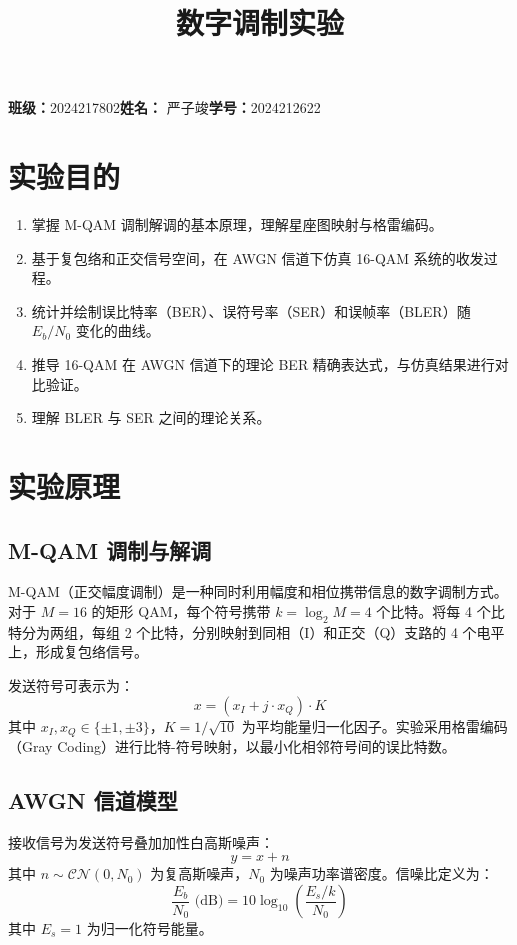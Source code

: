 \documentclass[UTF8]{ctexart}
\title{\textbf{数字调制实验}}
\author{}
\begin{document}
\maketitle

\begin{center}
    \textbf{班级：}2024217802\quad \textbf{姓名：} 严子竣\quad \textbf{学号：}2024212622
\end{center}

\section{实验目的}
\begin{enumerate}
    \item 掌握 M-QAM 调制解调的基本原理，理解星座图映射与格雷编码。
    \item 基于复包络和正交信号空间，在 AWGN 信道下仿真 16-QAM 系统的收发过程。
    \item 统计并绘制误比特率（BER）、误符号率（SER）和误帧率（BLER）随 \(E_b/N_0\) 变化的曲线。
    \item 推导 16-QAM 在 AWGN 信道下的理论 BER 精确表达式，与仿真结果进行对比验证。
    \item 理解 BLER 与 SER 之间的理论关系。
\end{enumerate}

\section{实验原理}

\subsection{M-QAM 调制与解调}
M-QAM（正交幅度调制）是一种同时利用幅度和相位携带信息的数字调制方式。对于 \(M=16\) 的矩形 QAM，每个符号携带 \(k = \log_2 M = 4\) 个比特。将每 4 个比特分为两组，每组 2 个比特，分别映射到同相（I）和正交（Q）支路的 4 个电平上，形成复包络信号。

发送符号可表示为：
\begin{equation}
    x = (x_I + j \cdot x_Q) \cdot K
\end{equation}
其中 \(x_I, x_Q \in \{\pm 1, \pm 3\}\)，\(K = 1/\sqrt{10}\) 为平均能量归一化因子。实验采用格雷编码（Gray Coding）进行比特-符号映射，以最小化相邻符号间的误比特数。

\subsection{AWGN 信道模型}
接收信号为发送符号叠加加性白高斯噪声：
\begin{equation}
    y = x + n
\end{equation}
其中 \(n \sim \mathcal{CN}(0, N_0)\) 为复高斯噪声，\(N_0\) 为噪声功率谱密度。信噪比定义为：
\begin{equation}
    \frac{E_b}{N_0} \text{ (dB)} = 10\log_{10}\left(\frac{E_s/k}{N_0}\right)
\end{equation}
其中 \(E_s = 1\) 为归一化符号能量。
\end{document}
